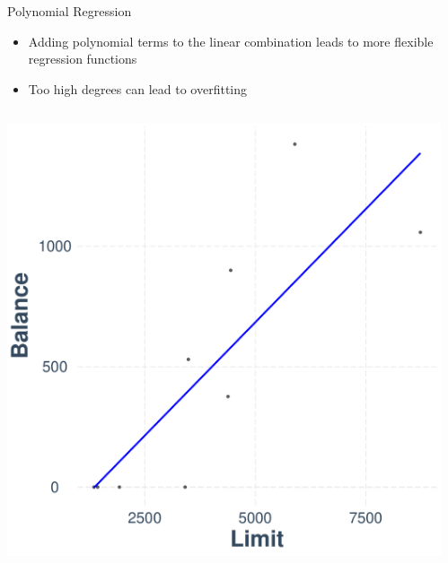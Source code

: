 \documentclass[11pt,compress,t,notes=noshow, xcolor=table]{beamer}
\begin{document}
\begin{vbframe}{Polynomial Regression}

\begin{itemize}
\small \item Adding polynomial terms to the linear combination leads to more flexible regression functions 
\small \item Too high degrees can lead to overfitting
\end{itemize}

\vspace{1cm}

\begin{columns}  
\begin{column}{0.3\textwidth} 
\tiny {}
 \includegraphics[width = \textwidth]{slides/supervised-regression/figure/nutshell-regression-poly-plot-1.pdf}
\end{column}
\begin{column}{0.3\textwidth} 
\tiny {}

\end{column}
\end{columns}
\end{vbframe}
\end{document}
